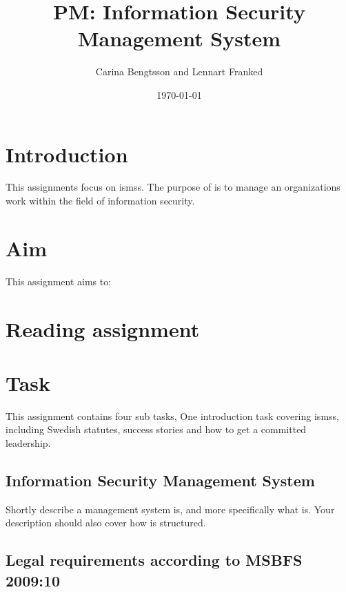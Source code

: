 \documentclass[a4paper]{article}
\begin{document}
\title{PM\@: Information Security Management System}
\author{%
  Carina Bengtsson and Lennart Franked
}
\date{\today}

\maketitle


\section{Introduction}
\label{sec:introduction}

This assignments focus on \acp{isms}. The purpose of  is to manage
an organizations work within the field of information security.

\section{Aim}
\label{sec:aim}

This assignment aims to:
\begin{itemize}
  
\end{itemize}


\section{Reading assignment}




\section{Task}\label{Work}

This assignment contains four sub tasks, One introduction task covering
\acp{isms}, including Swedish statutes, success stories and how to get a
committed leadership.

\subsection{Information Security Management System}
Shortly describe a management system is, and more specifically what  
is. Your description should also cover how  is
structured.

\subsection{Legal requirements according to MSBFS 2009:10}
\end{document}
